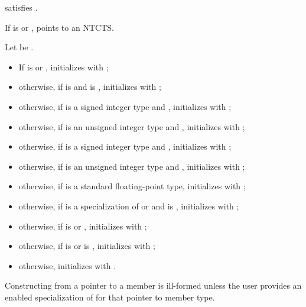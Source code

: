 \begin{itemdescr}
\pnum
\constraints
{} satisfies .

\pnum
\expects
If  is  or ,
 points to an NTCTS.

\pnum
\effects
Let  be .
\begin{itemize}
\item
If  is  or ,
initializes  with ;
\item
otherwise, if  is  and  is
, initializes  with
;
\item
otherwise, if  is a signed integer type
and ,
initializes  with ;
\item
otherwise, if  is an unsigned integer type and
, initializes
 with ;
\item
otherwise, if  is a signed integer type and
, initializes
 with ;
\item
otherwise, if  is an unsigned integer type and
, initializes
 with
;
\item
otherwise, if  is a standard floating-point type,
initializes  with ;
\item
otherwise, if  is
a specialization of  or  and
 is ,
initializes  with
;
\item
otherwise, if  is
 or ,
initializes  with ;
\item
otherwise, if  is  or
 is ,
initializes  with ;
\item
otherwise, initializes  with .
\end{itemize}
\begin{note}
Constructing  from a pointer to a member is ill-formed
unless the user provides an enabled specialization of 
for that pointer to member type.
\end{note}
\end{itemdescr}

